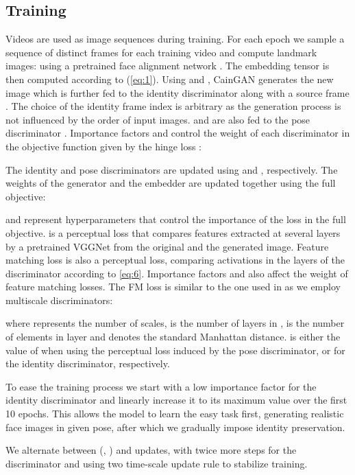 \documentclass[11pt,a4paper]{article}
\begin{document}
\subsection{Training}
Videos are used as image sequences during training. For each epoch we sample a sequence of  distinct frames for each training video and compute landmark images:  using a pretrained face alignment network \cite{bulat2017far}. The embedding tensor  is then computed according to (\ref{eq:1}). Using  and , CainGAN generates the new image  which is further fed to the identity discriminator  along with a source frame . The choice of the identity frame index  is arbitrary as the generation process is not influenced by the order of input images.  and  are also fed to the pose discriminator . Importance factors  and  control the weight of each discriminator in the objective function given by the hinge loss \cite{lim2017geometric,miyato2018spectral}:





The identity and pose discriminators are updated using  and , respectively. The weights of the generator and the embedder are updated together using the full objective:


 and  represent hyperparameters that control the importance of the loss in the full objective.  is a perceptual loss that compares features extracted at several layers by a pretrained VGGNet \cite{simonyan2014very} from the original and the generated image.
Feature matching loss  is also a perceptual loss, comparing activations in the layers of the discriminator according to \eqref{eq:6}. Importance factors  and  also affect the weight of feature matching losses. The FM loss is similar to the one used in \cite{wang2018pix2pixHD} as we employ multiscale discriminators:

where  represents the number of scales,  is the number of layers in ,  is the number of elements in layer  and  denotes the standard Manhattan distance.  is either the value of  when using the perceptual loss induced by the pose discriminator, or  for the identity discriminator, respectively.

To ease the training process we start with a low importance factor for the identity discriminator and linearly increase it to its maximum value over the first 10 epochs. This allows the model to learn the easy task first, generating realistic face images in given pose, after which we gradually impose identity preservation.

We alternate between (, ) and  updates, with twice more steps for the discriminator and using two time-scale update rule \cite{heusel2017gans} to stabilize training.  
\end{document}
